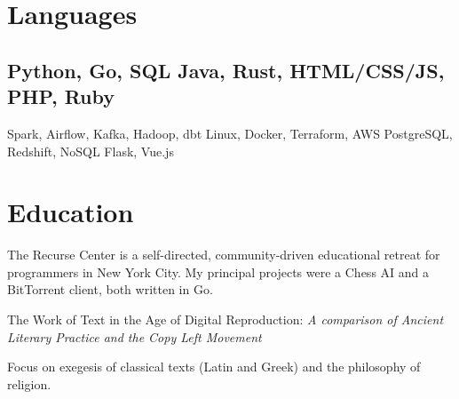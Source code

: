 \documentclass[]{deedy-resume-openfont}
\begin{document}
\section{Languages}
\vspace{\topsep} %
\subsection{Python, Go, SQL \textbullet{} Java, Rust, HTML/CSS/JS, PHP, Ruby}
\vspace{\topsep} %
Spark, Airflow, Kafka, Hadoop, dbt \textbullet{} Linux, Docker, Terraform, AWS \textbullet{} PostgreSQL, Redshift, NoSQL \textbullet{} Flask, Vue.js
\sectionsep


\section{Education}
\vspace{\topsep} %
\vspace{\topsep} %
The Recurse Center is a self-directed, community-driven educational retreat for programmers in New York City.\newline
My principal projects were a Chess AI and a BitTorrent client, both written in Go.
\sectionsep


\vspace{\topsep} %
The Work of Text in the Age of Digital Reproduction:
\textit{A comparison of Ancient Literary Practice and the Copy Left Movement}
\sectionsep %

\vspace{\topsep} %
Focus on exegesis of classical texts (Latin and Greek) and the philosophy of religion.
\sectionsep
\end{document}
